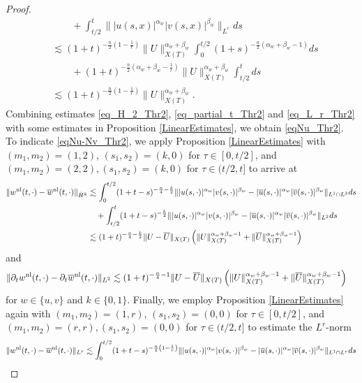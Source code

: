 \documentclass[11pt,reqno]{amsart}
\newcommand{\tron}[1]{\left(#1\right)}
\begin{document}
\begin{proof}
\begin{align}
			&\qquad + \int_{t/2}^t\||u(s,x)|^{\alpha_w}|v(s,x)|^{\beta_w}\|_{L^r}ds\nonumber \\
			&\lesssim  (1+t)^{-\frac{n}{2}\tron{1-\frac{1}{r}}} \|U\|_{X(T)}^{\alpha_w+\beta_w} \int_0^{t/2}(1+s)^{-\frac{n}{2}\tron{\alpha_w+\beta_w-1}}ds\nonumber\\
			&\qquad +  (1+t)^{-\frac{n}{2}\tron{\alpha_w+\beta_w-\frac{1}{r}}}\|U\|_{X(T)}^{\alpha_w+\beta_w} \int_{t/2}^t ds \nonumber\\
			&\lesssim (1+t)^{-\frac{n}{2}\tron{1-\frac{1}{r}}} \|U\|_{X(T)}^{\alpha_w+\beta_w}.
			\label{eq_L_r_Thr2}
		\end{align}
		Combining estimates \eqref{eq_H_2_Thr2}, \eqref{eq_partial_t_Thr2} and \eqref{eq_L_r_Thr2} with some estimates in Proposition \ref{LinearEstimates}, we obtain \eqref{eqNu_Thr2}. To indicate \eqref{eqNu-Nv_Thr2}, we apply Proposition \ref{LinearEstimates} with $(m_1,m_2) = (1,2)$, $(s_1, s_2) =(k,0)$ for $\tau \in [0, t/2]$, and $(m_1,m_2)=(2,2), (s_1,s_2) =(k,0)$ for $\tau \in (t/2, t]$ to arrive at
		\begin{align}
			\|w^{\rm nl}(t,\cdot)-\overline w^{\rm nl}(t,\cdot)\|_{\dot{H}^k} &\lesssim \int_{0}^{t/2}(1+t-s)^{-\frac{n}{4}-\frac{k}{2}}\||u(s,\cdot)|^{\alpha_w}|v(s,\cdot)|^{\beta_w}-|\overline u(s,\cdot)|^{\alpha_w}|\overline v(s,\cdot)|^{\beta_w}\|_{L^1\cap L^{2}}ds\nonumber\\
			&\quad+\int_{t/2}^t(1+t-s)^{-\frac{k}{2}}\||u(s,\cdot)|^{\alpha_w}|v(s,\cdot)|^{\beta_w}-|\overline u(s,\cdot)|^{\alpha_w}|\overline v(s,\cdot)|^{\beta_w}\|_{L^{2}}ds\nonumber\\
			&\lesssim (1+t)^{-\frac{n}{4}-\frac{k}{2}}\|U-\overline{U}\|_{X(T)}\tron{\|U\|^{\alpha_w+\beta_w-1}_{X(T)}+\|\overline{U}\|^{\alpha_w+\beta_w-1}_{X(T)}} \label{es_u_v_Lbeta_i}
		\end{align}
		and
		\begin{align}
			\|\partial_tw^{\rm nl}(t,\cdot)-\partial_t\overline w^{\rm nl}(t,\cdot)\|_{L^2} &\lesssim (1+t)^{-\frac{n}{4}-1}\|U-\overline{U}\|_{X(T)}\tron{\|U\|^{\alpha_w+\beta_w-1}_{X(T)}+\|\overline{U}\|^{\alpha_w+\beta_w-1}_{X(T)}} \label{es_u-v_partial_t_i}
		\end{align}
		for $w\in\{u,v\}$ and $k\in \{0,1\}$. Finally, we employ Proposition \ref{LinearEstimates} again with $(m_1,m_2) = (1,r)$, $(s_1, s_2) =(0,0)$ for $\tau \in [0, t/2]$, and $(m_1,m_2)=(r,r), (s_1,s_2) =(0,0)$ for $\tau \in (t/2, t]$ to estimate the $L^r$-norm
		\begin{align}
			\|w^{\rm nl}(t,\cdot)-\overline w^{\rm nl}(t,\cdot)\|_{L^r} &\lesssim \int_{0}^{t/2}(1+t-s)^{-\frac{n}{2}\tron{1-\frac{1}{r}}}\||u(s,\cdot)|^{\alpha_w}|v(s,\cdot)|^{\beta_w}-|\overline u(s,\cdot)|^{\alpha_w}|\overline v(s,\cdot)|^{\beta_w}\|_{L^1\cap L^{r}}ds\nonumber\\

\end{align}
\end{proof}
\end{document}
